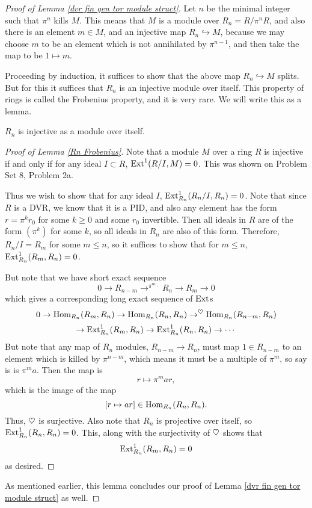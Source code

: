 \begin{proof}[Proof of Lemma \ref{dvr fin gen tor module struct}] Let $n$ be the minimal integer such that $\pi^n$ kills $M$. This means that $M$ is a module over $R_n=R/\pi^nR$, and also there is an element $m \in M$, and an injective map $R_n \hookrightarrow M$, because we may choose $m$ to be an element which is not annihilated by $\pi^{n-1}$, and then take the map to be $1 \mapsto m$.

Proceeding by induction, it suffices to show that the above map $R_n \hookrightarrow M$ splits. But for this it suffices that $R_n$ is an injective module over itself. This property of rings is called the Frobenius property, and it is very rare. We will write this as a lemma.
\begin{lemma} $R_n$ is injective as a module over itself.
\label{Rn Frobenius}
\end{lemma}
\begin{proof}[Proof of Lemma \ref{Rn Frobenius}] Note that a module $M$ over a ring $R$ is injective if and only if for any ideal $I \subset R$, $\operatorname{Ext}^1(R/I,M)=0$. This was shown on  Problem Set 8, Problem 2a.

Thus we wish to show that for any ideal $I$, $\operatorname{Ext}^1_{R_n}(R_n/I,R_n)=0$. Note that since $R$ is a DVR, we know that it is a PID, and also any element has the form $r=\pi^kr_0$ for some $k \geq 0$ and some $r_0$ invertible. Then all ideals in $R$ are of the form $(\pi^k)$ for some $k$, so all ideals in $R_n$ are also of this form. Therefore, $R_n/I=R_m$ for some $m \leq n$, so it suffices to show that for $m \leq n$, $\operatorname{Ext}^1_{R_n}(R_m,R_n)=0$.

But note that we have short exact sequence
\[ 0 \to R_{n-m} \to^{\pi^m \cdot} R_n \to R_m \to 0\]
which gives a corresponding long exact sequence of $\operatorname{Ext}$s
\[0 \to \operatorname{Hom}_{R_n}(R_m,R_n) \to \operatorname{Hom}_{R_n}(R_n,R_n) \to^\heartsuit \operatorname{Hom}_{R_n}(R_{n-m},R_n)\]
\[\to \operatorname{Ext}^1_{R_n}(R_m,R_n) \to \operatorname{Ext}^1_{R_n}(R_n,R_n) \to \cdots\]
But note that any map of $R_n$ modules, $R_{n-m} \to R_n$, must map $1 \in R_{n-m}$ to an element which is killed by $\pi^{n-m}$, which means it must be a multiple of $\pi^m$, so say is is $\pi^ma$. Then the map is
\[r \mapsto \pi^mar,\]
which is the image of the map
\[[r \mapsto ar] \in \operatorname{Hom}_{R_n}(R_n,R_n).\]
Thus, $\heartsuit$ is surjective.
Also note that $R_n$ is projective over itself, so $\operatorname{Ext}^1_{R_n}(R_n,R_n)=0$. This, along with the surjectivity of $\heartsuit$ shows that
\[\operatorname{Ext}^1_{R_n}(R_m,R_n)=0\]
as desired.
\end{proof}
As mentioned earlier, this lemma concludes our proof of Lemma \ref{dvr fin gen tor module struct} as well.
\end{proof}



